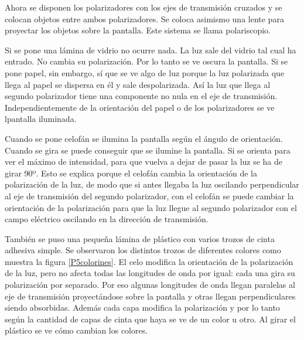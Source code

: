 \documentclass[12pt]{article}
\numberwithin{table}{section}
\numberwithin{figure}{section}
\numberwithin{equation}{section}
\begin{document}
Ahora se disponen los polarizadores con los ejes de transmisión cruzados y se colocan objetos entre ambos polarizadores. Se coloca asimismo una lente para proyectar los objetos sobre la pantalla. Este sistema se llama polariscopio.

Si se pone una lámina de vidrio no ocurre nada. La luz sale del vidrio tal cual ha entrado. No cambia su polarización. Por lo tanto se ve oscura la pantalla. Si se pone papel, sin embargo, sí que se ve algo de luz porque la luz polarizada que llega al papel se dispersa en él y sale despolarizada. Así la luz que llega al segundo polarizador tiene una componente no nula en el eje de transmisión. Independientemente de la orientación del papel o de los polarizadores se ve lpantalla iluminada.

Cuando se pone celofán se ilumina la pantalla según el ángulo de orientación. Cuando se gira se puede conseguir que se ilumine la pantalla. Si se orienta para ver el máximo de intensidad, para que vuelva a dejar de pasar la luz se ha de girar 90º. Esto se explica porque el celofán cambia la orientación de la polarización de la luz, de modo que si antes llegaba la luz oscilando perpendicular al eje de transmisión del segundo polarizador, con el celofán se puede cambiar la orientación de la polarización para que la luz llegue al segundo polarizador con el campo eléctrico oscilando en la dirección de transmisión.

También se puso una pequeña lámina de plástico con varios trozos de cinta adhesiva simple. Se observaron los distintos trozos de diferentes colores como muestra la figura \ref{P5colorines}. El celo modifica la orientación de la polarización de la luz, pero no afecta todas las longitudes de onda por igual: cada una gira su polarización por separado. Por eso algunas longitudes de onda llegan paralelas al eje de transmisión proyectándose sobre la pantalla y otras llegan perpendiculares siendo absorbidas. Además cada capa modifica la polarización y por lo tanto según la cantidad de capas de cinta que haya se ve de un color u otro. Al girar el plástico se ve cómo cambian los colores.
\end{document}
